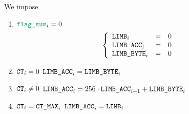 We impose
\begin{enumerate}
    \item \If $\flagSum _{i} = 0$ \Then
	\[
	    \left\{ \begin{array}{lcl}
		\texttt{LIMB}     _{i} & = & 0 \\
		\texttt{LIMB\_ACC}  _{i} & = & 0 \\
		\texttt{LIMB\_BYTE} _{i} & = & 0 \\
	    \end{array} \right.
	\]
    \item \If $\texttt{CT} _{i} =    0$           \Then $\texttt{LIMB\_ACC} _{i} = \texttt{LIMB\_BYTE} _{i}$
    \item \If $\texttt{CT} _{i} \neq 0$           \Then $\texttt{LIMB\_ACC} _{i} = 256 \cdot \texttt{LIMB\_ACC} _{i - 1} + \texttt{LIMB\_BYTE} _{i}$
    \item \If $\texttt{CT} _{i} =    \texttt{CT\_MAX} _{i}$ \Then $\texttt{LIMB\_ACC} _{i} = \texttt{LIMB} _{i}$
\end{enumerate}

